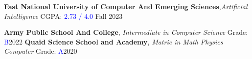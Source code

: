 



\begin{cvhonors}

  \cvhonor
    { {\bf Fast National University of Computer And Emerging Sciences},\textit{Artificial Intelligence} \hspace{0.1em} CGPA: \textcolor{blue}{2.73 / 4.0}}
    {Fall 2023} 

  \cvhonor
    { {\bf Army Public School And College\hspace{1em}},\textit{ Intermediate in Computer Science }         Grade: \textcolor{blue}{B}}{2022}
  \cvhonor
    {{\bf Quaid Science School and Academy\hspace{1em}},\textit{ Matric in Math Physics Computer} Grade: \textcolor{blue}{A}}{2020}

\end{cvhonors}







    
